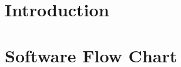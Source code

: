 



\maketitle

\section{Introduction}




\section{Software Flow Chart} %
\label{sec:software_flow_chart}

\begin{figure}[H]
    \centering
    
    \caption{}
    \label{fig:}
\end{figure}











